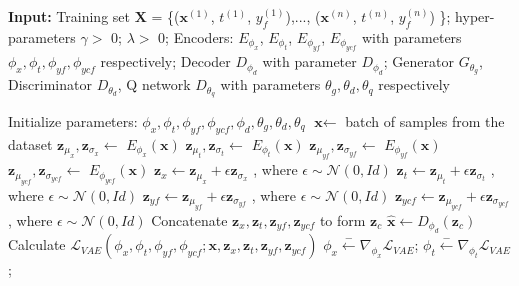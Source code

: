 \documentclass{amia}
\begin{document}
\begin{algorithm}
	\caption{Training of the generative adversarial network for counterfactual outcome calculation} 
	\label{algo: CF_GM}
	\hspace*{\algorithmicindent} \textbf{Input:}  {Training set $\boldsymbol{X}$ = \{($\textbf{x}^{(1)}$, $t^{(1)}$, $y_f^{(1)}$),...,
	($\textbf{x}^{(n)}$, $t^{(n)}$, $y_f^{(n)}$) \}; hyper-parameters $\gamma > $  0; $\lambda > $  0; Encoders: $E_{\phi_x}$,
	$E_{\phi_t}$, $E_{\phi_{yf}}$, $E_{\phi_{ycf}}$ with parameters ${\phi_x}, {\phi_t}, {\phi_{yf}}, {\phi_{ycf}}$ respectively; Decoder $D_{\phi_d}$ with parameter $D_{\phi_d}$; Generator $G_{\theta_g}$, Discriminator $D_{\theta_d}$, Q network 
	$D_{\theta_q}$ with parameters ${\theta_g}, {\theta_d}, {\theta_q}$ respectively}
	\begin{algorithmic}[1]
        \State Initialize parameters: ${\phi_x}, {\phi_t}, {\phi_{yf}}, {\phi_{ycf}}, {\phi_d}, {\theta_g}, {\theta_d}, {\theta_q}$
            \State $\textbf{x} \leftarrow$ batch of samples from the dataset  
            \State $\textbf{z}_{\mu_x}, \textbf{z}_{\sigma_x}\leftarrow$ $E_{\phi_x}(\textbf{x})$ 
            \State $\textbf{z}_{\mu_t}, \textbf{z}_{\sigma_t}\leftarrow$ $E_{\phi_t}(\textbf{x})$
            \State $\textbf{z}_{\mu_{yf}}, \textbf{z}_{\sigma_{yf}}\leftarrow$ $E_{\phi_{yf}}(\textbf{x})$
            \State $\textbf{z}_{\mu_{ycf}}, \textbf{z}_{\sigma_{ycf}}\leftarrow$ $E_{\phi_{ycf}}(\textbf{x})$
            \State $\textbf{z}_{x} \leftarrow \textbf{z}_{\mu_x} + \epsilon \textbf{z}_{\sigma_x}$ , where $\epsilon \sim \mathcal{N}(0, Id)$
            \State $\textbf{z}_{t} \leftarrow \textbf{z}_{\mu_t} + \epsilon \textbf{z}_{\sigma_t}$ , where $\epsilon \sim \mathcal{N}(0, Id)$
            \State $\textbf{z}_{yf} \leftarrow \textbf{z}_{\mu_{yf}} + \epsilon \textbf{z}_{\sigma_{yf}}$ , where $\epsilon \sim \mathcal{N}(0, Id)$
            \State $\textbf{z}_{ycf} \leftarrow \textbf{z}_{\mu_{ycf}} + \epsilon \textbf{z}_{\sigma_{ycf}}$ , where $\epsilon \sim \mathcal{N}(0, Id)$
            \State Concatenate $\textbf{z}_{x}, \textbf{z}_{t}, \textbf{z}_{yf}, \textbf{z}_{ycf}$ to form $\textbf{z}_c$
            \State $\hat{\textbf{x}}\leftarrow D_{\phi_d}(\textbf{z}_c)$
            \State Calculate $\mathcal{L}_{VAE}(\phi_x, \phi_t, \phi_{yf}, \phi_{ycf}; \textbf{x}, \textbf{z}_x, \textbf{z}_t, \textbf{z}_{yf}, \textbf{z}_{ycf})$
            \State $\phi_x \xleftarrow{-} \nabla_{\phi_x}\mathcal{L}_{VAE}$; 
            $\phi_t \xleftarrow{-} \nabla_{\phi_t}\mathcal{L}_{VAE}$;

\end{algorithmic}
\end{algorithm}
\end{document}
